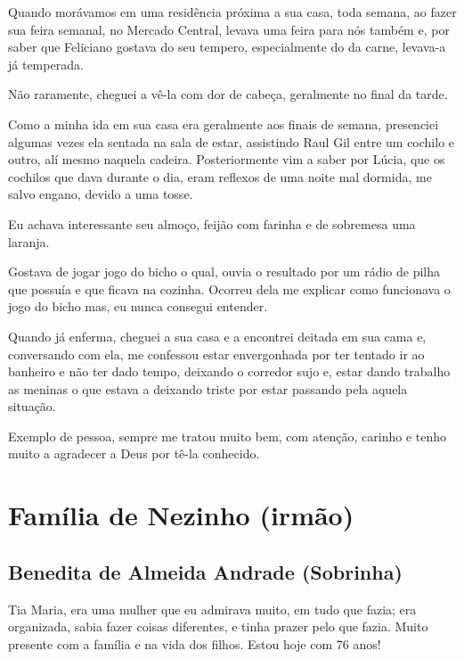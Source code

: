 \documentclass[
  brazil,
  a6paper,
  oneside,
  landscape,
  14pt]{scrbook}
\begin{document}
Quando morávamos em uma residência próxima a sua casa, toda semana, ao
fazer sua feira semanal, no Mercado Central, levava uma feira para nós
também e, por saber que Feliciano gostava do seu tempero, especialmente
do da carne, levava-a já temperada.

Não raramente, cheguei a vê-la com dor de cabeça, geralmente no final da
tarde.

Como a minha ida em sua casa era geralmente aos finais de semana,
presenciei algumas vezes ela sentada na sala de estar, assistindo Raul
Gil entre um cochilo e outro, alí mesmo naquela cadeira. Posteriormente
vim a saber por Lúcia, que os cochilos que dava durante o dia, eram
reflexos de uma noite mal dormida, me salvo engano, devido a uma tosse.

Eu achava interessante seu almoço, feijão com farinha e de sobremesa uma
laranja.

Gostava de jogar jogo do bicho o qual, ouvia o resultado por um rádio de
pilha que possuía e que ficava na cozinha. Ocorreu dela me explicar como
funcionava o jogo do bicho mas, eu nunca consegui entender.

Quando já enferma, cheguei a sua casa e a encontrei deitada em sua cama
e, conversando com ela, me confessou estar envergonhada por ter tentado
ir ao banheiro e não ter dado tempo, deixando o corredor sujo e, estar
dando trabalho as meninas o que estava a deixando triste por estar
passando pela aquela situação.

Exemplo de pessoa, sempre me tratou muito bem, com atenção, carinho e
tenho muito a agradecer a Deus por tê-la conhecido.

\hypertarget{famuxedlia-de-nezinho-irmuxe3o}{%
\chapter{Família de Nezinho
(irmão)}\label{famuxedlia-de-nezinho-irmuxe3o}}

\hypertarget{benedita-de-almeida-andrade-sobrinha}{%
\section{Benedita de Almeida Andrade
(Sobrinha)}\label{benedita-de-almeida-andrade-sobrinha}}

Tia Maria, era uma mulher que eu admirava muito, em tudo que fazia; era
organizada, sabia fazer coisas diferentes, e tinha prazer pelo que
fazia. Muito presente com a família e na vida dos filhos. Estou hoje com
76 anos!
\end{document}
